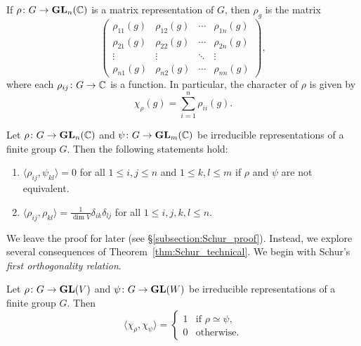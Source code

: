 If $\rho\colon G\to\mathbf{GL}_n(\mathbb{C})$ is a matrix representation of $G$, then
$\rho_g$ is the matrix
\[
\begin{pmatrix}
    \rho_{11}(g) & \rho_{12}(g) & \cdots & \rho_{1n}(g)\\
    \rho_{21}(g) & \rho_{22}(g) & \cdots & \rho_{2n}(g)\\
    \vdots & \vdots & \ddots & \vdots\\
    \rho_{n1}(g) & \rho_{n2}(g) & \cdots & \rho_{nn}(g)
\end{pmatrix},
\]
where each $\rho_{ij}\colon G\to\mathbb{C}$ is a function. 
In particular, the character of $\rho$ is given by
\[
\chi_\rho(g)=\sum_{i=1}^n\rho_{ii}(g).
\]


\begin{theorem}[Schur]
\label{thm:Schur_technical}
    Let $\rho\colon G\to\mathbf{GL}_n(\mathbb{C})$ and $\psi\colon G\to\mathbf{GL}_m(\mathbb{C})$ be irreducible representations of a finite group $G$. 
    Then the following statements hold:
    \begin{enumerate}
        \item $\langle\rho_{ij},\psi_{kl}\rangle=0$ for all $1\leq i,j\leq n$ and $1\leq k,l\leq m$ if $\rho$ and $\psi$ are not equivalent.
        \item $\displaystyle{\langle\rho_{ij},\rho_{kl}\rangle=\frac{1}{\dim V}\delta_{ik}\delta_{lj}}$ 
        for all $1\leq i,j,k,l\leq n$.
    \end{enumerate}
\end{theorem}

We leave the proof for later (see \S\ref{subsection:Schur_proof}). Instead, we explore several consequences of Theorem~\ref{thm:Schur_technical}. 
We begin with Schur's \emph{first orthogonality relation}.

\begin{theorem}[Schur]
\label{thm:Schur}
Let $\rho\colon G\to\mathbf{GL}(V)$ and $\psi\colon G\to\mathbf{GL}(W)$ be irreducible representations of a finite group $G$. Then
\[
\langle\chi_\rho,\chi_\psi\rangle=
\begin{cases}
1 & \text{if $\rho\simeq\psi$,}\\
0 & \text{otherwise.}
\end{cases}
\]
\end{theorem}

